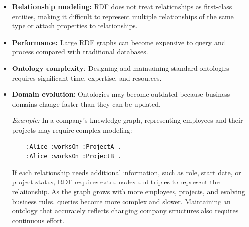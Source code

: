 \begin{itemize}
  \item \textbf{Relationship modeling:} RDF does not treat relationships as
        first-class entities, making it difficult to represent multiple
        relationships of the same type or attach properties to relationships.

  \item \textbf{Performance:} Large RDF graphs can become expensive to query
        and process compared with traditional databases.

  \item \textbf{Ontology complexity:} Designing and maintaining standard
        ontologies requires significant time, expertise, and resources.

  \item \textbf{Domain evolution:} Ontologies may become outdated because
        business domains change faster than they can be updated.

        \textit{Example:} In a company's knowledge graph, representing employees
        and their projects may require complex modeling:

        \begin{verbatim}
    :Alice :worksOn :ProjectA .
    :Alice :worksOn :ProjectB .
    \end{verbatim}

        If each relationship needs additional information, such as role, start
        date, or project status, RDF requires extra nodes and triples to represent
        the relationship. As the graph grows with more employees, projects, and
        evolving business rules, queries become more complex and slower. Maintaining
        an ontology that accurately reflects changing company structures also
        requires continuous effort.
\end{itemize}